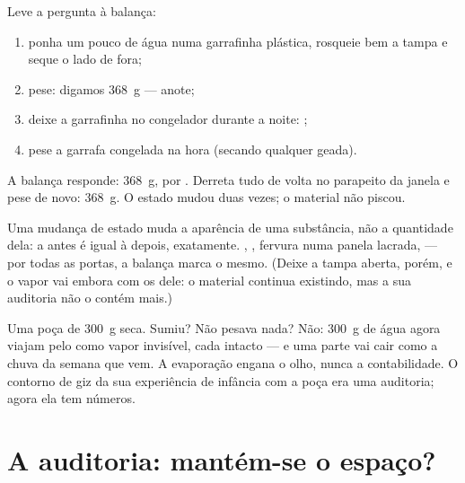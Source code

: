 \begin{method}\label{met:g6:water-states:weigh}
Leve a pergunta à balança:
\begin{enumerate}
  \item ponha um pouco de água numa garrafinha plástica, rosqueie bem
        a tampa e seque o lado de fora;
  \item pese: digamos \qty{368}{g} --- anote;
  \item deixe a garrafinha no congelador durante a noite:
        ;
  \item pese a garrafa congelada na hora (secando qualquer geada).
\end{enumerate}
A balança responde: \qty{368}{g},  por . Derreta tudo de
volta no parapeito da janela e pese de novo: \qty{368}{g}. O estado
mudou duas vezes; o material não piscou.
\end{method}

\begin{proposition}\label{prop:g6:water-states:mass}
Uma mudança de estado muda a aparência de uma substância, não a
quantidade dela: a  antes é igual à  depois, exatamente.
, , fervura numa panela lacrada,  ---
por todas as portas, a balança marca o mesmo. (Deixe a tampa aberta,
porém, e o vapor vai embora com os  dele: o material continua
existindo, mas a sua auditoria não o contém mais.)
\end{proposition}

\begin{example}\label{ex:g6:water-states:puddle}
Uma poça de \qty{300}{g} seca. Sumiu? Não pesava nada? Não:
\qty{300}{g} de água agora viajam pelo  como vapor invisível, cada
 intacto --- e uma parte vai cair como a chuva da semana que
vem. A evaporação engana o olho, nunca a contabilidade. O contorno de
giz da sua experiência de infância com a poça era uma auditoria;
agora ela tem números.
\end{example}

\section{A auditoria: mantém-se o espaço?}

